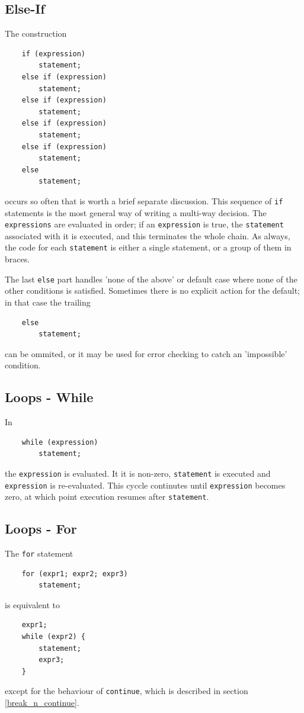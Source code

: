 \documentclass{scrartcl}
\begin{document}
        \subsection{Else-If}
            The construction
            \begin{lstlisting}
    if (expression)
        statement;
    else if (expression)
        statement;
    else if (expression)
        statement;
    else if (expression)
        statement;
    else if (expression)
        statement;
    else
        statement;
            \end{lstlisting}
            occurs so often that is worth a brief separate discussion. This
            sequence of \texttt{if} statements is the most general way of writing
            a multi-way decision. The \texttt{expressions} are evaluated in order;
            if an \texttt{expression} is true, the \texttt{statement} associated
            with it is executed, and this terminates the whole chain. As always,
            the code for each \texttt{statement} is either a single statement,
            or a group of them in braces.

            The last \texttt{else} part handles 'none of the above' or default
            case where none of the other conditions is satisfied. Sometimes there
            is no explicit action for the default; in that case the trailing
            \begin{lstlisting}
    else
        statement;
            \end{lstlisting}
            can be ommited, or it may be used for error checking to catch an
            'impossible' condition.
        \subsection{Loops - While}
            In
            \begin{lstlisting}
    while (expression)
        statement;
            \end{lstlisting}
            the \texttt{expression} is evaluated. It it is non-zero, \texttt{statement}
            is executed and \texttt{expression} is re-evaluated. This cyccle continutes
            until \texttt{expression} becomes zero, at which point execution
            resumes after \texttt{statement}.
        \subsection{Loops - For}
            The \texttt{for} statement
            \begin{lstlisting}
    for (expr1; expr2; expr3)
        statement;
            \end{lstlisting}
            is equivalent to
            \begin{lstlisting}
    expr1;
    while (expr2) {
        statement;
        expr3;
    }
            \end{lstlisting}
            except for the behaviour of \texttt{continue}, which is described
            in section \ref{break_n_continue}.
\end{document}
